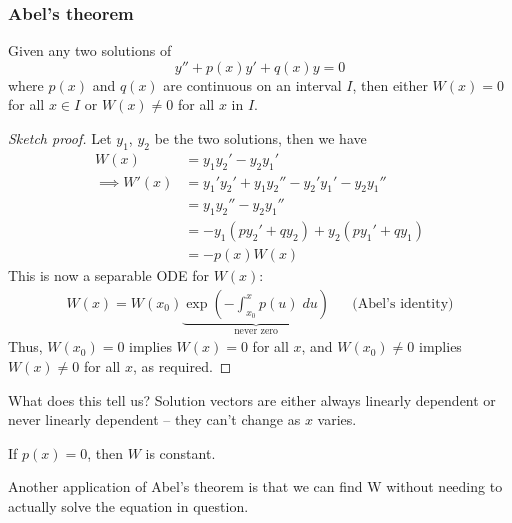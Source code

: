 \documentclass{../../template/note}
\begin{document}
    
    \subsubsection{Abel's theorem}

    \begin{theorem}
        Given any two solutions of
        \[
            y'' + p(x)y' + q(x)y = 0
        \]
        where \(p(x)\) and \(q(x)\) are continuous on an interval \(I\), then either \(W(x) = 0\) for all \(x \in I\) or \(W(x) \neq 0\) for all \(x\) in \(I\).
    \end{theorem}
    
    \begin{proof}[Sketch proof]
        Let \(y_1\), \(y_2\) be the two solutions, then we have
        \begin{align*}
            W(x) &= y_1y_2' - y_2y_1' \\
            \implies W'(x) &= y_1'y_2' + y_1y_2'' - y_2'y_1' - y_2y_1'' \\
            &= y_1y_2'' - y_2y_1'' \\
            &= -y_1(py_2' + qy_2) + y_2(py_1'+qy_1) \\
            &= -p(x)W(x)
        \end{align*}
        This is now a separable ODE for \(W(x)\):
        \begin{align*}
            W(x) = W(x_0) \underbrace{\exp\left(-\int_{x_0}^x p(u) \; du\right)}_{\text{never zero}} && \text{(Abel's identity)}
        \end{align*}
        Thus, \(W(x_0) = 0\) implies \(W(x) = 0\) for all \(x\), and \(W(x_0) \neq 0\) implies \(W(x) \neq 0\) for all \(x\), as required.
    \end{proof}
    
    What does this tell us? Solution vectors are either always linearly dependent or never linearly dependent -- they can't change as \(x\) varies.

    \begin{corollary}
        If \(p(x) = 0\), then \(W\) is constant.
    \end{corollary}
    
    Another application of Abel's theorem is that we can find W without needing to actually solve the equation in question.
\end{document}
